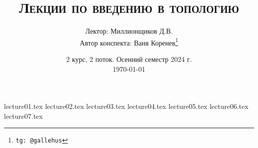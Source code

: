 \documentclass[a4paper]{article}
\title{\scshape {Лекции по введению в топологию}}
\date{2 курс, 2 поток. Осенний семестр 2024 г. \\ \today}
\author{Лектор: Миллионщиков Д.В. \\ Автор конспекта: Ваня Коренев\thanks{\texttt{tg: @gallehus}}}
\begin{document}
\maketitle
\newpage
\tableofcontents

\newpage

{lecture01.tex}
{lecture02.tex}
{lecture03.tex}
{lecture04.tex}
{lecture05.tex}
{lecture06.tex}
{lecture07.tex}
\end{document}
